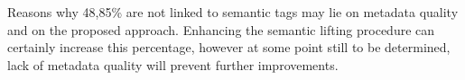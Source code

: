 Reasons why 48,85\% are not linked to semantic tags may lie on metadata quality and on the proposed approach.
Enhancing the semantic lifting procedure can certainly increase this percentage, however at some point still to be determined, lack of metadata quality will prevent further improvements.





